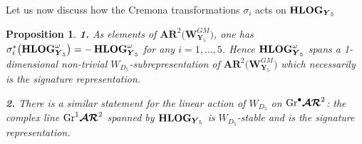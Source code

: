 \documentclass[11pt]{amsart}
\newcommand{\sk}{\smallskip}
\newtheorem{prop}[thm]{Proposition}
\begin{document}
Let us now discuss how the Cremona transformations $\sigma_i$ acts on 
${\bf HLOG}_{ \boldsymbol{Y}_5}$

\begin{prop}
\label{Prop:Transformation-sigma-i}
{\bf 1.} As elements of $\boldsymbol{AR}^2\big( \boldsymbol{W}^{GM}_{\boldsymbol{Y}_5} \big)$, one has $\sigma_i^*
\big(  {\bf HLOG}^\omega_{ \boldsymbol{Y}_5}\big)=-  \, {\bf HLOG}^\omega_{ \boldsymbol{Y}_5}$
for any $i=1,\ldots,5$.  Hence 
$ {\bf HLOG}^\omega_{ \boldsymbol{Y}_5}$ spans a 1-dimensional non-trivial $W_{D_5}$-subrepresentation 
of $\boldsymbol{AR}^2\big( \boldsymbol{W}^{GM}_{\boldsymbol{Y}_5} \big)$ 
which necessarily is the signature representation. 
\sk 

\noindent 
{\bf 2.} There is a similar statement for the linear action of $W_{D_5}$ on 
${\rm Gr}^\bullet  \boldsymbol{\mathcal A\mathcal R}^2$: the complex line 
${\rm Gr}^1  \boldsymbol{\mathcal A\mathcal R}^2$ spanned by ${\bf HLOG}_{ \boldsymbol{Y}_5}$ is $W_{D_5}$-stable and is the signature representation. 
\end{prop}
\end{document}
